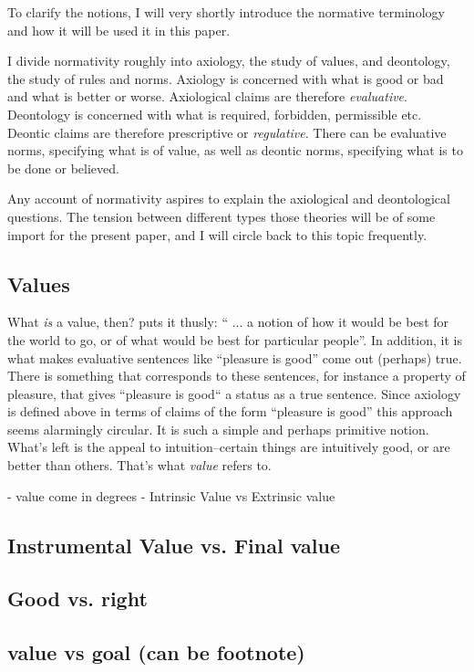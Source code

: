 \documentclass[12pt,numbers=noenddot]{scrartcl}
\begin{document}
To clarify the notions, I will very shortly introduce the normative terminology and how it will be used it in this paper.

I divide normativity roughly into axiology, the study of values, and deontology, the study of rules and norms. Axiology is concerned with what is good or bad and what is better or worse. Axiological claims are therefore \emph{evaluative}. Deontology is concerned with what is required, forbidden, permissible etc. Deontic claims are therefore prescriptive or \emph{regulative}. There can be evaluative norms, specifying what is of value, as well as deontic norms, specifying what is to be done or believed.

Any account of normativity aspires to explain the axiological and deontological questions. The tension between different types those theories will be of some import for the present paper, and I will circle back to this topic frequently.

\subsection{ Values }
What \emph{is} a value, then? \textcite[79]{scanlon1998} puts it thusly: “ ... a notion of how it would be best for the world to go, or of what would be best for particular people”. In addition, it is what makes evaluative sentences like “pleasure is good” come out (perhaps) true. There is something that corresponds to these sentences, for instance a property of pleasure, that gives “pleasure is good“ a status as a true sentence. Since axiology is defined above in terms of claims of the form “pleasure is good” this approach seems alarmingly circular. It is such a simple and perhaps primitive notion. What's left is the appeal to intuition–certain things are intuitively good, or are better than others. That's what \emph{value} refers to.

- value come in degrees
- Intrinsic Value vs Extrinsic value

\subsection{ Instrumental Value vs. Final value }
\subsection{ Good vs. right }
\subsection{ value vs goal (can be footnote)}
\end{document}
